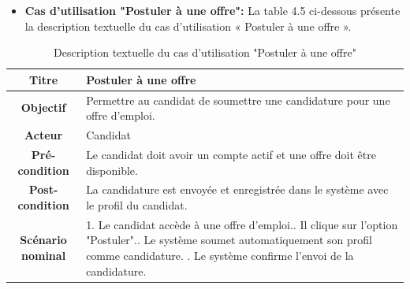 \begin{itemize}
        \item \textbf{Cas d'utilisation "Postuler à une offre": } La table 4.5 ci-dessous présente la description textuelle du cas d'utilisation « Postuler à une offre ».
    \end{itemize}
    \begin{table}[H]
    \caption{ Description textuelle du cas d’utilisation "Postuler à une offre"}
    \centering
    \begin{tabular}{|c|p{12cm}|}
    \hline
    \textbf{Titre} & Postuler à une offre \\
    \hline
    \textbf{Objectif} & Permettre au candidat de soumettre une candidature pour une offre d’emploi. \\
    \hline
    \textbf{Acteur}& Candidat\\
    \hline
    \textbf{Pré-condition} & Le candidat doit avoir un compte actif et une offre doit être disponible.
    \\
    \hline
    \textbf{Post-condition} & La candidature est envoyée et enregistrée dans le système avec le profil du candidat.\\
    \hline
    \textbf{Scénario nominal} & 1. Le candidat accède à une offre d’emploi.\newline
    2. Il clique sur l’option "Postuler".\newline
    3. Le système soumet automatiquement son profil comme candidature.
    \newline
    4. Le système confirme l’envoi de la candidature.\\
    \hline
    \end{tabular}
    \label{tab:user_stories}
\end{table}

